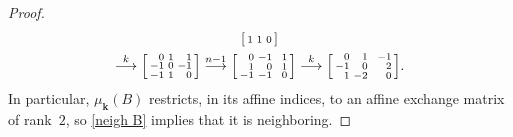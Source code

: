 \documentclass{amsart}
\theoremstyle{definition}
\theoremstyle{remark}
\numberwithin{equation}{section}
\newcommand{\0}{{\mathbf{0}}}
\newcommand{\kk}{\mathbf{k}}
\begin{document}
\begin{proof}
\begin{multline*}
\begin{bsmallmatrix*}[r]
1&1&0
\end{bsmallmatrix*}\\
\overset{k}{\longrightarrow}
\begin{bsmallmatrix*}[r]
0&1&\,\,\,1\\
-1&0&-1\\
-1&1&0
\end{bsmallmatrix*}
\overset{n-1}{\longrightarrow}
\begin{bsmallmatrix*}[r]
0&-1&\,\,\,1\\
1&0&1\\
-1&-1&0
\end{bsmallmatrix*}
\overset{k}{\longrightarrow}
\begin{bsmallmatrix*}[r]
0&1&\,\,\,-1\\
-1&0&2\\
1&-2&0
\end{bsmallmatrix*}.
\end{multline*}
In particular, $\mu_\kk(B)$ restricts, in its affine indices, to an affine exchange matrix of rank~$2$,
so \cref{neigh B} implies that it is neighboring.


\end{proof}
\end{document}
